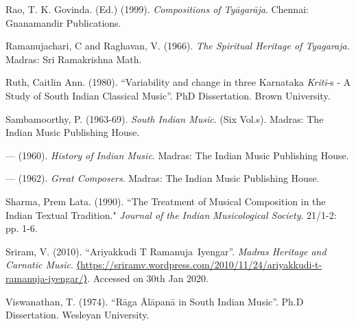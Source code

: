 \begin{thebibliography}{99}
  Rao, T. K. Govinda. (Ed.) (1999). \textit{Compositions of Tyāgarāja}. Chennai: Gnanamandir Publications.

  Ramanujachari, C and Raghavan, V. (1966). \textit{The Spiritual Heritage of Tyagaraja}. Madras: Sri Ramakrishna Math.

  Ruth, Caitlin Ann. (1980). “Variability and change in three Karnataka \textit{Kriti}-s - A Study of South Indian Classical Music”. PhD Dissertation. Brown University.

  Sambamoorthy, P. (1963-69). \textit{South Indian Music}. (Six Vol.s). Madras: The Indian Music Publishing House.

  — (1960). \textit{History of Indian Music}. Madras: The Indian Music Publishing House.

  — (1962). \textit{Great Composers}. Madras: The Indian Music Publishing House.

  Sharma, Prem Lata. (1990). ``The Treatment of Musical Composition in the Indian Textual Tradition." \textit{Journal of the Indian Musicological Society}. 21/1-2: pp. 1-6.

  Sriram, V. (2010). “Ariyakkudi T Ramanuja Iyengar”. \textit{Madras Heritage and Carnatic Music}. \url{⟨https://sriramv.wordpress.com/2010/11/24/ariyakkudi-t-ramanuja-iyengar/⟩}. Accessed on 30th Jan 2020.

  Viswanathan, T. (1974). “Rāga Ālāpanā in South Indian Music”. Ph.D Dissertation. Wesleyan University.

 \end{thebibliography}

